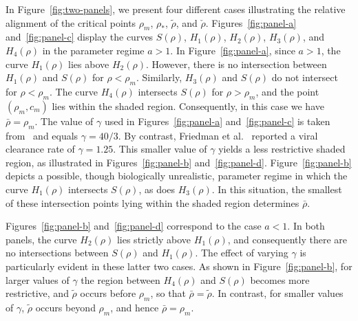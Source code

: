 \documentclass[11pt]{article}
\theoremstyle{definition}
\begin{document}
In Figure~\ref{fig:two-panels}, we present four different cases illustrating the relative alignment of the critical points
$\rho_m$, $\rho_{*}$, $\tilde{\rho}$, and $\check{\rho}$.
Figures~\ref{fig:panel-a} and~\ref{fig:panel-c} display the curves
$S(\rho)$, $H_{1}(\rho)$, $H_{2}(\rho)$, $H_{3}(\rho)$, and $H_{4}(\rho)$
in the parameter regime $a>1$.
In Figure~\ref{fig:panel-a}, since $a>1$, the curve $H_{1}(\rho)$ lies above
$H_{2}(\rho)$. However, there is no intersection between $H_{1}(\rho)$ and
$S(\rho)$ for $\rho<\rho_m$. Similarly, $H_{3}(\rho)$ and $S(\rho)$ do not
intersect for $\rho<\rho_m$. The curve $H_{4}(\rho)$ intersects $S(\rho)$ for
$\rho>\rho_m$, and the point $(\rho_m,c_m)$ lies within the shaded region.
Consequently, in this case we have $\bar{\rho}=\rho_m$.
The value of $\gamma$ used in Figures~\ref{fig:panel-a} and~\ref{fig:panel-c}
is taken from~\cite{arwa} and equals $\gamma=40/3$. By contrast, Friedman
et al.~\cite{FriedmanAvner2006GVEo} reported a viral clearance rate of $\gamma=1.25$.
This smaller value of $\gamma$ yields a less restrictive shaded region, as
illustrated in Figures~\ref{fig:panel-b} and~\ref{fig:panel-d}.
Figure~\ref{fig:panel-b} depicts a possible, though biologically unrealistic,
parameter regime in which the curve $H_{1}(\rho)$ intersects $S(\rho)$, as does
$H_{3}(\rho)$. In this situation, the smallest of these intersection points
lying within the shaded region determines $\bar{\rho}$. 

Figures~\ref{fig:panel-b}
and~\ref{fig:panel-d} correspond to the case $a<1$. In both panels, the curve
$H_{2}(\rho)$ lies strictly above $H_{1}(\rho)$, and consequently there are no
intersections between $S(\rho)$ and $H_{1}(\rho)$.
The effect of varying $\gamma$ is particularly evident in these latter two
cases. As shown in Figure~\ref{fig:panel-b}, for larger values  of $\gamma$ the
region between $H_{4}(\rho)$ and $S(\rho)$ becomes more restrictive, and
$\tilde{\rho}$ occurs before $\rho_m$, so that $\bar{\rho}=\tilde{\rho}$.
In contrast, for smaller values of $\gamma$, $\tilde{\rho}$ occurs beyond
$\rho_m$, and hence $\bar{\rho}=\rho_m$.
\end{document}
